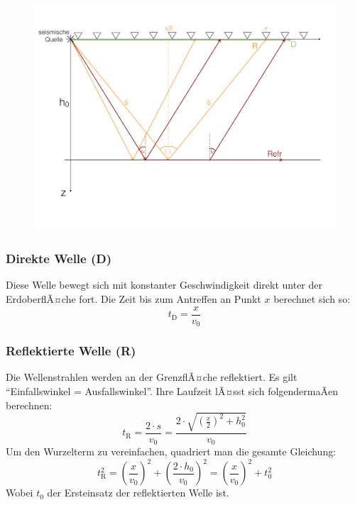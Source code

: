 \begin{figure}[H]
	\centering
	\includegraphics[width = \textwidth]{RefraktionsseismikBilder/soehliger2SchichtFallStrahlen}
\end{figure}


\subsubsection{Direkte Welle (D)}
Diese Welle bewegt sich mit konstanter Geschwindigkeit direkt unter der ErdoberflÃ¤che fort. Die Zeit bis zum Antreffen an Punkt $x$ berechnet sich so: \begin{equation*}
	t_{\text{D}} = \frac{x}{v_0}
\end{equation*}

\subsubsection{Reflektierte Welle (R)}
Die Wellenstrahlen werden an der GrenzflÃ¤che reflektiert. Es gilt "`Einfallswinkel = Ausfallswinkel"'. Ihre Laufzeit lÃ¤sst sich folgendermaÃen berechnen: \begin{equation*}
	t_{\text{R}} = \frac{2 \cdot s}{v_0} = \frac{2 \cdot \sqrt{\left( \frac{x}{2} \right) ^2 + h_0^2}}{v_0}
\end{equation*}
Um den Wurzelterm zu vereinfachen, quadriert man die gesamte Gleichung: \begin{equation*}
	t_{\text{R}}^2 = \left( \frac{x}{v_0} \right)^2 + \left( \frac{2 \cdot h_0}{v_0} \right) ^2 =  \left( \frac{x}{v_0} \right)^2 + t_0^2
\end{equation*}
Wobei $t_0$ der Ersteinsatz der reflektierten Welle ist.

